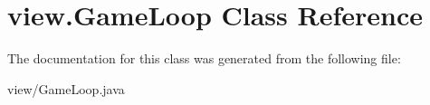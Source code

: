 \hypertarget{classview_1_1GameLoop}{\section{view.\-Game\-Loop Class Reference}
\label{classview_1_1GameLoop}
}


The documentation for this class was generated from the following file\-:\begin{DoxyCompactItemize}
\item 
view/Game\-Loop.\-java\end{DoxyCompactItemize}
